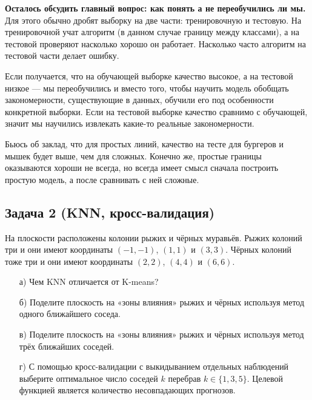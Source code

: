\documentclass[12pt, a4paper, oneside]{article}
\theoremstyle{plain} %
\theoremstyle{definition}
\begin{document}
{	\textbf{Осталось обсудить главный вопрос: как понять а не переобучились ли мы.}  Для этого обычно дробят выборку на две части: тренировочную и тестовую. На тренировочной учат алгоритм (в данном случае границу между классами), а на тестовой проверяют насколько хорошо он работает. Насколько часто алгоритм на тестовой части делает ошибку. 
	
	Если получается, что на обучающей выборке качество высокое, а на тестовой низкое --- мы переобучились и вместо того, чтобы научить модель обобщать закономерности, существующие в данных, обучили его под особенности конкретной выборки.  Если на тестовой выборке качество сравнимо с обучающей, значит мы научились извлекать какие-то реальные закономерности.
	
	Бьюсь об заклад, что для простых линий, качество на тесте для бургеров и мышек будет выше, чем для сложных.  Конечно же, простые границы оказываются хороши не всегда, но всегда имеет смысл сначала построить простую модель, а после сравнивать с ней сложные. 
}

\subsection*{Задача 2 (KNN, кросс-валидация)}

На плоскости расположены колонии рыжих и чёрных муравьёв. Рыжих колоний три и они имеют координаты $(-1, -1)$, $(1, 1)$ и $(3, 3)$. Чёрных колоний тоже три и они имеют координаты $(2, 2)$, $(4, 4)$ и $(6, 6)$.

\begin{enumerate}
	\item[а)] Чем KNN отличается от K-means? 
	\item[б)] Поделите плоскость на «зоны влияния» рыжих и чёрных используя метод одного ближайшего соседа.
	\item[в)] Поделите плоскость на «зоны влияния» рыжих и чёрных используя метод трёх ближайших соседей.
	\item[г)] С помощью кросс-валидации с выкидыванием отдельных наблюдений выберите оптимальное число соседей $k$ перебрав $k \in \{1, 3, 5\}$. Целевой функцией является количество несовпадающих прогнозов.
\end{enumerate}
\end{document}

